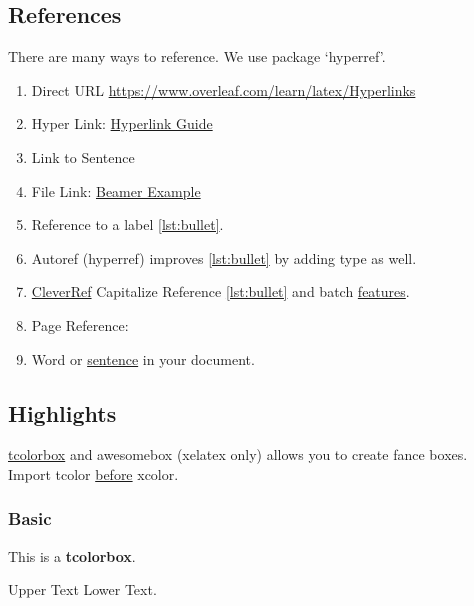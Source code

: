 \documentclass{report}[a4paper,12pt] %
\begin{document}
\subsection{References}
There are many ways to reference. We use package `hyperref'.
\begin{enumerate}
  \item Direct URL \url{https://www.overleaf.com/learn/latex/Hyperlinks}
  \item Hyper Link: \href{https://www.overleaf.com/learn/latex/Hyperlinks}{Hyperlink Guide}
  \item Link to Sentence
  \item File Link: \href{run:../../presentation/beamer/tutorial.tex}{Beamer Example}
  \item Reference to a label \ref{lst:bullet}.
  \item Autoref (hyperref) improves \autoref{lst:bullet} by adding type as well.
  \item \href{https://ctan.org/pkg/cleveref}{CleverRef} Capitalize Reference \cref{lst:bullet} and batch \href{https://texblog.org/2013/05/06/cleveref-a-clever-way-to-reference-in-latex/}{features}.
  \item Page Reference: \pageref{fig:coffee}
  \item Word or \hyperlink{sen:formatopts}{sentence} in your document.
\end{enumerate}

\subsection{Highlights}
\href{https://mirror.niser.ac.in/ctan/macros/latex/contrib/tcolorbox/tcolorbox.pdf}{tcolorbox} and awesomebox (xelatex only) allows you to create
fance boxes. Import tcolor \href{https://tex.stackexchange.com/questions/238303/tcolorbox-incompatibe-with-color-package}{before} xcolor.

\subsubsection{Basic}
\begin{tcolorbox}
  This is a \textbf{tcolorbox}.
\end{tcolorbox}

\begin{tcolorbox}[colback=blue!25!white,colframe=green!75!black,title=Box Heading]
  Upper Text
  \tcblower
  Lower Text.
\end{tcolorbox}
\end{document}
